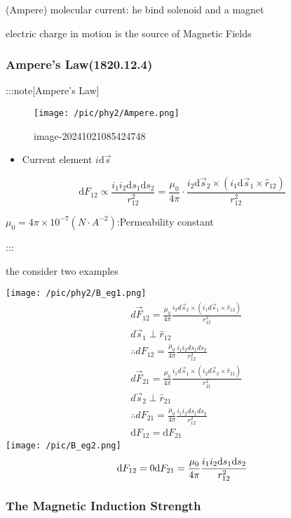 \documentclass[
]{article}
\providecommand{\tightlist}{%
  \setlength{\itemsep}{0pt}\setlength{\parskip}{0pt}}
\begin{document}
(Ampere) molecular current: he bind solenoid and a magnet

electric charge in motion is the source of Magnetic Fields

\hypertarget{amperes-law1820.12.4}{%
\subsubsection{Ampere's Law(1820.12.4)}\label{amperes-law1820.12.4}}

:::note{[}Ampere's Law{]}

\begin{figure}
\centering
\texttt{[image: /pic/phy2/Ampere.png]}
\caption{image-20241021085424748}
\end{figure}

\begin{itemize}
\tightlist
\item
  Current element \(i\mathrm d \vec s\)
\end{itemize}

\[
\mathrm d F_{12}\propto \frac{i_1i_2\mathrm d s_1\mathrm d s_2}{r_{12}^2}=\frac{\mu _0}{4\pi } \cdot \frac{i_2\mathrm d \vec s_2\times (i_1\mathrm d \vec s_1\times \hat r_{12})}{r_{12}^2}
\]

\(\mu_0 =4\pi\times10^{-7}(N\cdot A^{-2})\):Permeability constant

:::

the consider two examples

\texttt{[image: /pic/phy2/B\_eg1.png]} \[
\begin{aligned}
&d\vec{F}_{12}=\frac{\mu_0}{4\pi}\frac{i_2d\vec{s}_2\times(i_1d\vec{s}_1\times\hat{r}_{12})}{r_{12}^2} \\
&d\vec{s}_1\perp\hat{r}_{12} \\
&\therefore dF_{12}=\frac{\mu_0}{4\pi}\frac{i_1i_2ds_1ds_2}{r_{12}^2}\\&d\vec{F}_{21}=\frac{\mu_0}{4\pi}\frac{i_1d\vec{s}_1\times(i_2d\vec{s}_2\times\hat{r}_{21})}{r_{21}^2}\\&d\vec{s}_2\perp\hat{r}_{21}\\&\therefore dF_{21}=\frac{\mu_0}{4\pi}\frac{i_1i_2ds_1ds_2}{r_{12}^2}\\&\mathrm d F_{12}= \mathrm d F_{21}\end{aligned}
\] \texttt{[image: /pic/B\_eg2.png]} \[
\mathrm d F_{12}=0\\\mathrm d F_{21}=\frac{\mu_0}{4\pi}\frac{i_1i_2\mathrm d s_1\mathrm d s_2}{r_{12}^2}
\]

\hypertarget{the-magnetic-induction-strength}{%
\subsubsection{The Magnetic Induction
Strength}\label{the-magnetic-induction-strength}}
\end{document}
